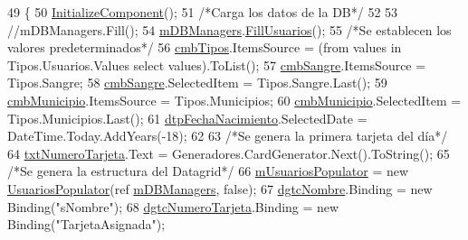 \begin{DoxyCode}
49         \{
50             \hyperlink{class_proyecto___integrador__3_1_1_main_window_ab7151625146f0c268d8404f4ab8869bc}{InitializeComponent}();
51             \textcolor{comment}{/*Carga los datos de la DB*/}
52 
53             \textcolor{comment}{//mDBManagers.Fill();}
54             \hyperlink{class_proyecto___integrador__3_1_1_main_window_ad2b88cf68cee145343b2da734c94d8d5}{mDBManagers}.\hyperlink{class_proyecto___integrador__3_1_1_d_b_managers_a27dce97a7e23ba80a56b545ccfeb73ee}{FillUsuarios}();
55             \textcolor{comment}{/*Se establecen los valores predeterminados*/}
56             \hyperlink{class_proyecto___integrador__3_1_1_main_window_a6ffda9fa41aae566606ef782be37ed11}{cmbTipos}.ItemsSource = (from values in Tipos.Usuarios.Values select values).ToList();
57             \hyperlink{class_proyecto___integrador__3_1_1_main_window_a78f29679759491825a6a30ad89e8a867}{cmbSangre}.ItemsSource = Tipos.Sangre;
58             \hyperlink{class_proyecto___integrador__3_1_1_main_window_a78f29679759491825a6a30ad89e8a867}{cmbSangre}.SelectedItem = Tipos.Sangre.Last();
59             \hyperlink{class_proyecto___integrador__3_1_1_main_window_a6fad73b5f18398cb423384f61d36ff9a}{cmbMunicipio}.ItemsSource = Tipos.Municipios;
60             \hyperlink{class_proyecto___integrador__3_1_1_main_window_a6fad73b5f18398cb423384f61d36ff9a}{cmbMunicipio}.SelectedItem = Tipos.Municipios.Last();
61             \hyperlink{class_proyecto___integrador__3_1_1_main_window_a366d1c04863cd090fb2a941de8adbd3d}{dtpFechaNacimiento}.SelectedDate = DateTime.Today.AddYears(-18);
62             
63             \textcolor{comment}{/*Se genera la primera tarjeta del día*/}
64             \hyperlink{class_proyecto___integrador__3_1_1_main_window_aa002c65e1d03d58932cae92c7523198a}{txtNumeroTarjeta}.Text = Generadores.CardGenerator.Next().ToString();
65             \textcolor{comment}{/*Se genera la estructura del Datagrid*/}
66             \hyperlink{class_proyecto___integrador__3_1_1_main_window_a3c9586e06a8edee79c1217a3985b4b68}{mUsuariosPopulator} = \textcolor{keyword}{new} \hyperlink{_main_window_8xaml_8cs_a9b6fea16165d9a40204bde2f9eb53148}{UsuariosPopulator}(ref 
      \hyperlink{class_proyecto___integrador__3_1_1_main_window_ad2b88cf68cee145343b2da734c94d8d5}{mDBManagers}, \textcolor{keyword}{false});
67             \hyperlink{class_proyecto___integrador__3_1_1_main_window_a867d58258d7e2baa1b4d446dda2f2c51}{dgtcNombre}.Binding = \textcolor{keyword}{new} Binding(\textcolor{stringliteral}{"sNombre"});
68             \hyperlink{class_proyecto___integrador__3_1_1_main_window_ab28b60d43c765aa3cf2dc7c64e56f8c7}{dgtcNumeroTarjeta}.Binding = \textcolor{keyword}{new} Binding(\textcolor{stringliteral}{"TarjetaAsignada"});

\end{DoxyCode}
